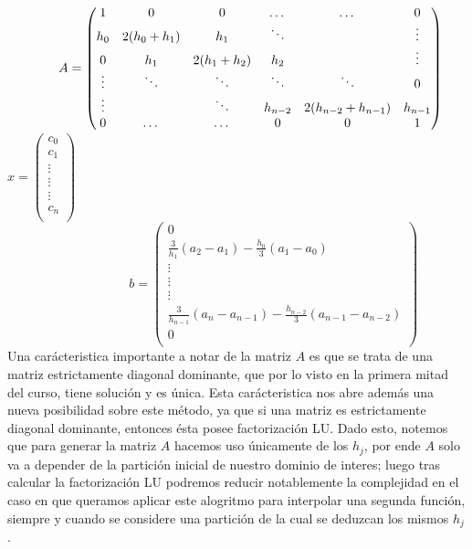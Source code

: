 \vspace{4mm}
$
\hspace{1.4cm}
A =
     \begin{pmatrix}
      1 & 0 & 0 & \dots & \dots & 0 \\
	  h_0 & 2(h_0 + h_1) & h_1 & \ddots &  & \vdots \\
	  0 & h_1 & 2(h_1 + h_2) & h_2 &  & \vdots \\
	  \vdots & \ddots & \ddots & \ddots & \ddots & 0\\
	  \vdots & & \ddots & h_{n-2} & 2(h_{n-2} + h_{n-1}) & h_{n-1} \\
	  0  & \dots & \dots & 0 & 0 & 1 \\
     \end{pmatrix}
$
$
x =
     \begin{pmatrix}
      c_0 \\
	  c_1 \\
	  \vdots \\
	  \vdots \\
	  \vdots \\
	  c_n \\
     \end{pmatrix}
$
\\
\vspace{4mm}
$
\hspace{4cm}
b =
     \begin{pmatrix}
      0 \\
	  \frac{3}{h_1}(a_2 - a_1) - \frac{h_0}{3}(a_1 - a_0) \\
	  \vdots \\
	  \vdots \\
	  \vdots \\
	  \frac{3}{h_{n-1}}(a_n - a_{n-1}) - \frac{h_{n-2}}{3}(a_{n-1} - a_{n-2}) \\
	  0 \\
     \end{pmatrix}
$
\\
Una carácteristica importante a notar de la matriz $A$ es que se trata de una matriz estrictamente diagonal dominante, que por lo visto en la primera mitad del curso, tiene solución y es única. Esta carácteristica nos abre además una nueva posibilidad sobre este método, ya que si una matriz es estrictamente diagonal dominante, entonces ésta posee factorización LU. Dado esto, notemos que para generar la matriz $A$ hacemos uso únicamente de los $h_j$, por ende $A$ solo va a depender de la partición inicial de nuestro dominio de interes; luego tras calcular la factorización LU podremos reducir notablemente la complejidad en el caso en que queramos aplicar este alogritmo para interpolar una segunda función, siempre y cuando se considere una partición de la cual se deduzcan los mismos $h_j$.
\vspace{4mm}

